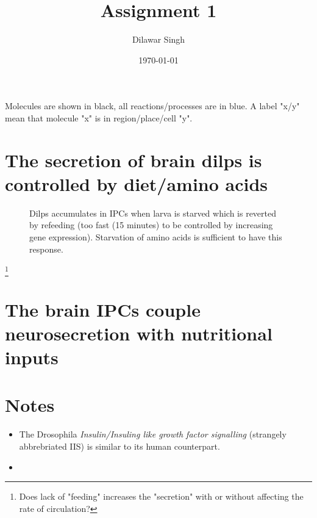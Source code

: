 \documentclass[]{article}
\title{Assignment 1}
\author{Dilawar Singh}
\date{\today}
\begin{document}
\maketitle

Molecules are shown in black, all reactions/processes are in blue. A label "x/y"
mean that molecule "x" is in region/place/cell "y".

\section{The secretion of brain dilps is controlled by diet/amino acids}
\label{the-secretion-of-brain-dilps-is-controlled-by-diet}

\begin{figure}[ht!]
    \centering
{}    
\caption{
    Dilps accumulates in IPCs when larva is starved which is reverted
        by refeeding (too fast (15 minutes) to be controlled by increasing gene
        expression). Starvation of amino acids is sufficient to have this response.
    } 
\end{figure}

\footnote{Does lack of "feeding" increases the "secretion" with or without
    affecting the rate of circulation?}

\section{The brain IPCs couple neurosecretion with nutritional inputs}


\section{Notes}\label{notes}

\begin{itemize}
\item
  The Drosophila \emph{Insulin/Insuling like growth factor signalling}
  (strangely abbrebriated IIS) is similar to its human counterpart.
\item
\end{itemize}
\end{document}
